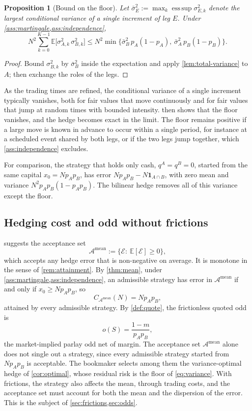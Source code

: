\documentclass[11pt,a4paper]{article}
\theoremstyle{plain}
\newtheorem{proposition}[theorem]{Proposition}
\theoremstyle{definition}
\theoremstyle{remark}
\newcommand{\E}{\mathbb{E}}
\newcommand{\1}{\mathbf{1}}
\begin{document}
\begin{proposition}[Bound on the floor]
\label{prop:floor}
Let $\bar\sigma^2_E := \max_k\operatorname{ess\,sup}\sigma^2_{E,k}$ denote the largest conditional variance of a single increment of leg $E$. Under \cref{ass:martingale,ass:independence},
\[
N^2\sum_{k=0}^{K-1}\E\bigl[\sigma^2_{A,k}\,\sigma^2_{B,k}\bigr]\leq N^2\min\bigl\{\bar\sigma^2_B\,p_A(1-p_A),\ \bar\sigma^2_A\,p_B(1-p_B)\bigr\}.
\]
\end{proposition}

\begin{proof}
Bound $\sigma^2_{B,k}$ by $\bar\sigma^2_B$ inside the expectation and apply \cref{lem:total-variance} to $A$; then exchange the roles of the legs.
\end{proof}

As the trading times are refined, the conditional variance of a single increment typically vanishes, both for fair values that move continuously and for fair values that jump at random times with bounded intensity.  then shows that the floor vanishes, and the hedge becomes exact in the limit. The floor remains positive if a large move is known in advance to occur within a single period, for instance at a scheduled event shared by both legs, or if the two legs jump together, which \cref{ass:independence} excludes.

For comparison, the strategy that holds only cash, $q^A = q^B = 0$, started from the same capital $x_0 = Np_Ap_B$, has error $Np_Ap_B - N\1_{A\cap B}$, with zero mean and variance $N^2p_Ap_B(1-p_Ap_B)$. The bilinear hedge removes all of this variance except the floor.

\subsection{Hedging cost and odd without frictions}

 suggests the acceptance set
\[
\mathcal{A}^{\mathrm{mean}} := \bigl\{\mathcal{E}:\ \E[\mathcal{E}]\geq 0\bigr\},
\]
which accepts any hedge error that is non-negative on average. It is monotone in the sense of \cref{rem:attainment}. By \cref{thm:mean}, under \cref{ass:martingale,ass:independence}, an admissible strategy has error in $\mathcal{A}^{\mathrm{mean}}$ if and only if $x_0\geq Np_Ap_B$, so
\[
C_{\mathcal{A}^{\mathrm{mean}}}(N) = Np_Ap_B,
\]
attained by every admissible strategy. By \cref{def:quote}, the frictionless quoted odd is
\[
o(S) = \frac{1-m}{p_Ap_B},
\]
the market-implied parlay odd net of margin. The acceptance set $\mathcal{A}^{\mathrm{mean}}$ alone does not single out a strategy, since every admissible strategy started from $Np_Ap_B$ is acceptable. The bookmaker selects among them the variance-optimal hedge of \cref{cor:optimal}, whose residual risk is the floor of \eqref{eq:variance}. With frictions, the strategy also affects the mean, through trading costs, and the acceptance set must account for both the mean and the dispersion of the error. This is the subject of \cref{sec:frictions,sec:odds}.
\end{document}
